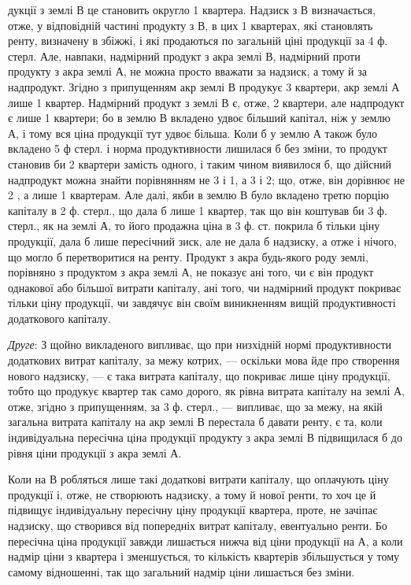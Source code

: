 \parcont{}  %
дукції з землі В це становить округло 1  квартера. Надзиск з В визначається,
отже, у відповідній частині продукту з В, в цих 1  квартерах, які
становлять ренту, визначену в збіжжі, і які продаються по загальній ціні продукції
за 4   ф. стерл. Але, навпаки, надмірний продукт з акра землі В, надмірний
проти продукту з акра землі А, не можна просто вважати за надзиск,
а тому й за надпродукт. Згідно з припущенням акр землі В продукує 3  квартери,
акр землі А лише 1 квартер. Надмірний продукт з землі В є, отже,
2  квартери, але надпродукт є лише 1  квартери; бо в землю В вкладено
удвоє більший капітал, ніж у землю А, і тому вся ціна продукції тут удвоє
більша. Коли б у землю А також було вкладено 5 ф стерл. і норма продуктивности
лишилася б без зміни, то продукт становив би 2 квартери замість одного,
і таким чином виявилося б, що дійсний надпродукт можна знайти порівнянням
не 3   і 1, а 3   і 2; що, отже, він дорівнює не 2  , а лише 1   квартерам.
Але далі, якби в землю В було вкладено третю порцію капіталу в 2   ф. стерл.,
що дала б лише 1 квартер, так що він коштував би 3 ф. стерл., як на землі А, то
його продажна ціна в 3 ф. ст. покрила б тільки ціну продукції, дала б лише
пересічний зиск, але не дала б надзиску, а отже і нічого, що могло б перетворитися
на ренту. Продукт з акра будь-якого роду землі, порівняно з продуктом
з акра землі А, не показує ані того, чи є він продукт однакової або більшої
витрати капіталу, ані того, чи надмірний продукт покриває тільки ціну продукції,
чи завдячує він своїм виникненням вищій продуктивності додаткового капіталу.

\emph{Друге}: З щойно викладеного випливає, що при низхідній нормі продуктивности
додаткових витрат капіталу, за межу котрих, — оскільки мова йде
про створення нового надзиску, — є така витрата капіталу, що покриває лише
ціну продукції, тобто що продукує квартер так само дорого, як рівна витрата
капіталу на землі А, отже, згідно з припущенням, за 3 ф. стерл., — випливає,
що за межу, на якій загальна витрата капіталу на акр землі В перестала б
давати ренту, є та, коли індивідуальна пересічна ціна продукції продукту з
акра землі В підвищилася б до рівня ціни продукції з акра землі А.

Коли на В робляться лише такі додаткові витрати капіталу, що оплачують
ціну продукції і, отже, не створюють надзиску, а тому й нової ренти, то хоч
це й підвищує індивідуальну пересічну ціну продукції квартера, проте, не зачіпає
надзиску, що створився від попередніх витрат капіталу, евентуально ренти. Бо
пересічна ціна продукції завжди лишається нижча від ціни продукції на А, а коли
надмір ціни з квартера і зменшується, то кількість квартерів збільшується
у тому самому відношенні, так що загальний надмір ціни лишається без зміни.

